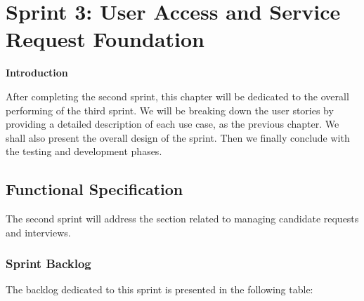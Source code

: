 \chapter{Sprint 3:  User Access and Service Request Foundation}
\newpage
\begin{center}
    \centering
    \LARGE\textbf{Introduction} 
     \vspace{1cm} \\
   \raggedright
\end{center}
After completing the second sprint, this chapter will be dedicated to the overall performing of the third sprint.
We will be breaking down the user stories by providing a detailed description of each use case, as the previous chapter.
We shall also present the overall design of the sprint.
Then we finally conclude with the testing and development phases.
\section{Functional Specification}
The second sprint will address the section related to managing candidate requests and interviews.
\subsection{Sprint Backlog}
The backlog dedicated to this sprint is presented in the following table:
\renewcommand{\arraystretch}{1.2}
\setlength{\tabcolsep}{6pt}

